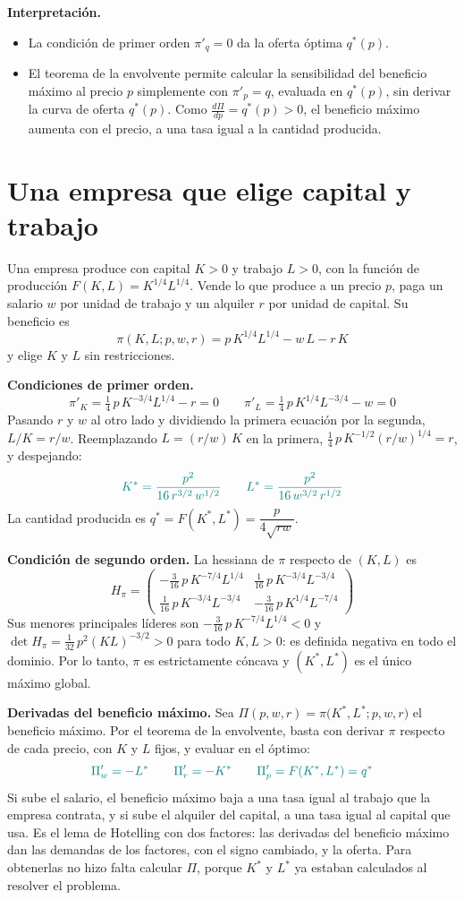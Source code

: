 \documentclass{article}
\begin{document}
\textbf{Interpretación.}
\begin{itemize}
  \item La condición de primer orden \(\pi'_q=0\) da la oferta óptima \(q^*(p)\).
  \item El teorema de la envolvente permite calcular la sensibilidad del beneficio máximo al precio \(p\) simplemente con \(\pi'_p=q\), evaluada en \(q^*(p)\), sin derivar la curva de oferta \(q^*(p)\). Como \(\tfrac{d\Pi}{dp}=q^*(p)>0\), el beneficio máximo aumenta con el precio, a una tasa igual a la cantidad producida.
\end{itemize}

\section*{Una empresa que elige capital y trabajo}

Una empresa produce con capital \(K>0\) y trabajo \(L>0\), con la función de producción \(F(K,L)=K^{1/4}L^{1/4}\). Vende lo que produce a un precio \(p\), paga un salario \(w\) por unidad de trabajo y un alquiler \(r\) por unidad de capital. Su beneficio es
\[
\pi(K,L;p,w,r)=p\,K^{1/4}L^{1/4}-w\,L-r\,K
\]
y elige \(K\) y \(L\) sin restricciones.

\textbf{Condiciones de primer orden.}
\[
\pi'_K=\tfrac14\,p\,K^{-3/4}L^{1/4}-r=0
\qquad
\pi'_L=\tfrac14\,p\,K^{1/4}L^{-3/4}-w=0
\]
Pasando \(r\) y \(w\) al otro lado y dividiendo la primera ecuación por la segunda, \(L/K=r/w\). Reemplazando \(L=(r/w)\,K\) en la primera, \(\tfrac14\,p\,K^{-1/2}(r/w)^{1/4}=r\), y despejando:
\[
\color{teal}
K^*=\frac{p^2}{16\,r^{3/2}\,w^{1/2}}
\qquad
L^*=\frac{p^2}{16\,w^{3/2}\,r^{1/2}}
\]
La cantidad producida es \(q^*=F(K^*,L^*)=\dfrac{p}{4\sqrt{rw}}\).

\textbf{Condición de segundo orden.} La hessiana de \(\pi\) respecto de \((K,L)\) es
\[
H_\pi=\begin{pmatrix}
-\tfrac{3}{16}\,p\,K^{-7/4}L^{1/4} & \tfrac{1}{16}\,p\,K^{-3/4}L^{-3/4}\\[0.5em]
\tfrac{1}{16}\,p\,K^{-3/4}L^{-3/4} & -\tfrac{3}{16}\,p\,K^{1/4}L^{-7/4}
\end{pmatrix}
\]
Sus menores principales líderes son \(-\tfrac{3}{16}\,p\,K^{-7/4}L^{1/4}<0\) y \(\det H_\pi=\tfrac{1}{32}\,p^2(KL)^{-3/2}>0\) para todo \(K,L>0\): es definida negativa en todo el dominio. Por lo tanto, \(\pi\) es estrictamente cóncava y \((K^*,L^*)\) es el único máximo global.

\textbf{Derivadas del beneficio máximo.} Sea \(\Pi(p,w,r)=\pi\bigl(K^*,L^*;p,w,r\bigr)\) el beneficio máximo. Por el teorema de la envolvente, basta con derivar \(\pi\) respecto de cada precio, con \(K\) y \(L\) fijos, y evaluar en el óptimo:
\[
\color{teal}
\Pi'_w=-L^*
\qquad
\Pi'_r=-K^*
\qquad
\Pi'_p=F(K^*,L^*)=q^*
\]
Si sube el salario, el beneficio máximo baja a una tasa igual al trabajo que la empresa contrata, y si sube el alquiler del capital, a una tasa igual al capital que usa. Es el lema de Hotelling con dos factores: las derivadas del beneficio máximo dan las demandas de los factores, con el signo cambiado, y la oferta. Para obtenerlas no hizo falta calcular \(\Pi\), porque \(K^*\) y \(L^*\) ya estaban calculados al resolver el problema.
\end{document}
